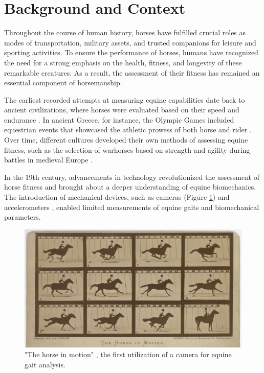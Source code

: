 \section{Background and Context}
\label{sec:intro_background}

Throughout the course of human history, horses have fulfilled crucial roles as modes of transportation, military assets, and trusted companions for leisure and sporting activities. To ensure the performance of horses, humans have recognized the need for a strong emphasis on the health, fitness, and longevity of these remarkable creatures. As a result, the assessment of their fitness has remained an essential component of horsemanship.

 The earliest recorded attempts at measuring equine capabilities date back to ancient civilizations, where horses were evaluated based on their speed and endurance \cite{ani11071859}. In ancient Greece, for instance, the Olympic Games included equestrian events that showcased the athletic prowess of both horse and rider \cite{britanica}. Over time, different cultures developed their own methods of assessing equine fitness, such as the selection of warhorses based on strength and agility during battles in medieval Europe \cite{harison}.
 
In the 19th century, advancements in technology revolutionized the assessment of horse fitness and brought about a deeper understanding of equine biomechanics. The introduction of mechanical devices, such as cameras \cite{eadweardmuybridge_1899_animals} (Figure \ref{muybridge}) and accelerometers \cite{marey}, enabled limited measurements of equine gaits and biomechanical parameters.

\begin{figure}[htbp]
\centering
\includegraphics[width=.8\linewidth]{../tables/Muybridge.jpg}
\caption{"The horse in motion" \cite{eadweardmuybridge_1899_animals}, the first utilization of a camera for equine gait analysis.}
\label{muybridge}
\end{figure}

